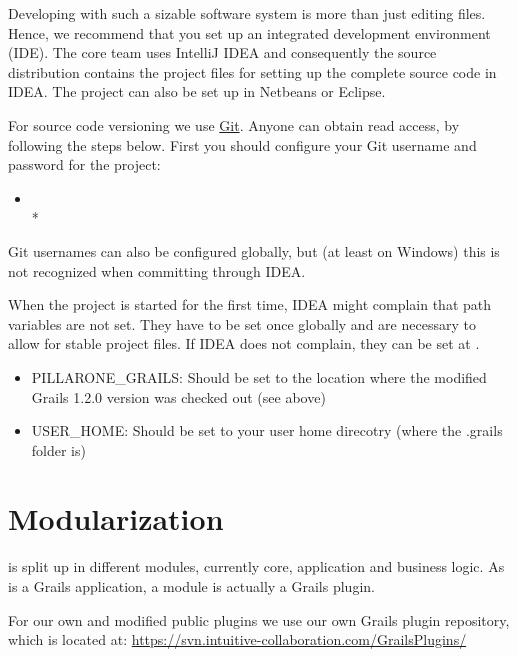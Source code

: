 Developing with such a sizable software system is more than just editing files. Hence, we
recommend that you set up an integrated development environment (IDE). The core team uses
IntelliJ IDEA and consequently the source distribution contains the project files for
setting up the complete \RA{} source code in IDEA. The project can also be set up in
Netbeans or Eclipse.

For source code versioning we use \href{http://git-scm.com/}{Git}. Anyone can obtain read
access, by following the steps below.
First you should configure your Git username and password for the project:

\begin{itemize}
	\item[]
		\\*
\end{itemize}

Git usernames can also be configured globally, but (at least on Windows) this is not
recognized when committing through IDEA.

When the project is started for the first time, IDEA might complain that path variables are not set.
They have to be set once globally and are necessary to allow for stable project files.
If IDEA does not complain, they can be set at .

\begin{itemize}
	\item PILLARONE\_GRAILS: Should be set to the location where the modified Grails 1.2.0
		version was checked out (see above)
	\item USER\_HOME: Should be set to your user home direcotry (where the .grails folder is)
\end{itemize}


\chapter{Modularization}
\label{chap:devguide-modularization}

\RA{} is split up in different modules, currently core, application and business logic.
As \RA{} is a Grails application, a module is actually a Grails plugin.

For our own and modified public plugins we use our own Grails plugin repository, which is
located at: \url{https://svn.intuitive-collaboration.com/GrailsPlugins/}

